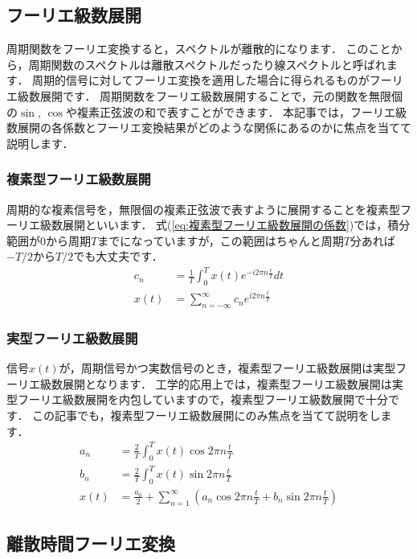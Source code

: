 \subsection{フーリエ級数展開}

周期関数をフーリエ変換すると，スペクトルが離散的になります．
このことから，周期関数のスペクトルは離散スペクトルだったり線スペクトルと呼ばれます．
周期的信号に対してフーリエ変換を適用した場合に得られるものがフーリエ級数展開です．
周期関数をフーリエ級数展開することで，元の関数を無限個の$\sin$, $\cos$や複素正弦波の和で表すことができます．
本記事では，フーリエ級数展開の各係数とフーリエ変換結果がどのような関係にあるのかに焦点を当てて説明します．

\subsubsection{複素型フーリエ級数展開}

周期的な複素信号を，無限個の複素正弦波で表すように展開することを複素型フーリエ級数展開といいます．
式(\ref{eq:複素型フーリエ級数展開の係数})では，積分範囲が$0$から周期$T$までになっていますが，この範囲はちゃんと周期$T$分あれば$-T/2$から$T/2$でも大丈夫です．
\begin{align}
c_n &= \frac{1}{T} \int_{0}^{T} x(t) e^{-i2\pi n \frac{t}{T}} dt \label{eq:複素型フーリエ級数展開の係数}\\
x(t) &= \sum_{n=-\infty}^{\infty} c_n e^{i2\pi n \frac{t}{T}}
\end{align}


\subsubsection{実型フーリエ級数展開}

信号$x(t)$が，周期信号かつ実数信号のとき，複素型フーリエ級数展開は実型フーリエ級数展開となります．
工学的応用上では，複素型フーリエ級数展開は実型フーリエ級数展開を内包していますので，複素型フーリエ級数展開で十分です．
この記事でも，複素型フーリエ級数展開にのみ焦点を当てて説明をします．
\begin{align}
a_n &= \frac{2}{T} \int_0^T x(t) \cos {2\pi n \frac{t}{T}} \\
b_n &= \frac{2}{T} \int_0^T x(t) \sin {2\pi n \frac{t}{T}} \\
x(t) &= \frac{a_0}{2} + \sum_{n=1}^{\infty}\left(a_n \cos {2\pi n \frac{t}{T}} + b_n \sin {2\pi n \frac{t}{T}} \right)
\end{align}


\subsection{離散時間フーリエ変換}


